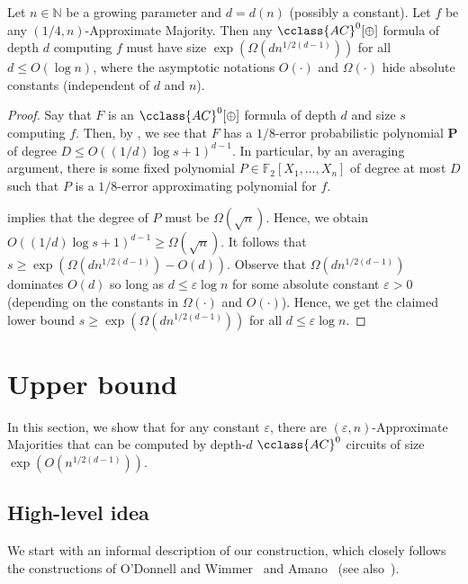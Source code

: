 \documentclass{toc}
\newcommand{\eps}{\varepsilon}
\newcommand{\mb}{\mathbf}
\newcommand{\F}{\mathbb{F}}
\newcommand{\AC}{\cclass{AC}}
\begin{document}
\begin{corollary}
\label{cor:formula-lbd}
Let $n\in \mathbb{N}$ be a growing parameter and $d = d(n)$ (possibly a constant). 
Let $f$ be any $(1/4,n)$-Approximate Majority. Then any $\AC^0[\oplus]$ formula of depth $d$ computing $f$ must have size $\exp(\Omega(dn^{1/2(d-1)}))$ for all $d \le O(\log n)$, where the asymptotic notations $O(\cdot)$ and $\Omega(\cdot)$ hide absolute constants (independent of $d$ and $n$). 
\end{corollary}

\begin{proof}
Say that $F$ is an $\AC^0[\oplus]$ formula of depth $d$ and size $s$ computing $f$. Then, by , we see that $F$ has a $1/8$-error probabilistic polynomial $\mb P$ of degree $D\leq O(({1}/{d})\log s+1)^{d-1}$. In particular, by an averaging argument, there is some fixed polynomial $P\in \F_2[X_1,\ldots,X_n]$ of degree at most $D$ such that $P$ is a $1/8$-error approximating polynomial for $f$. 

 implies that the degree of $P$ must be $\Omega(\sqrt{n})$. Hence, we obtain $O(({1}/{d})\log s+1)^{d-1} \ge \Omega(\sqrt{n})$. It follows that
$s \ge \exp(\Omega(dn^{1/2(d-1)}) - O(d))$.
Observe that $\Omega(dn^{1/2(d-1)})$ dominates $O(d)$ so long as $d \le \eps \log n$ for some absolute constant $\eps > 0$ (depending on the constants in $\Omega(\cdot)$ and $O(\cdot)$). Hence, we get the claimed lower bound  $s \ge \exp(\Omega(dn^{1/2(d-1)}))$
for all $d \le \eps\log n$.
\end{proof}


%
\section{Upper bound}      %

In this section, we show that for any constant $\varepsilon$, there are $(\varepsilon,n)$-Approximate Majorities that can be computed by depth-$d$ $\AC^0$ circuits of size $\exp(O(n^{1/2(d-1)}))$.

\subsection{High-level idea}

We start with an informal description of our construction, which closely follows the constructions of O'Donnell and Wimmer~\cite{odonnellwimmer} and Amano~\cite{Amano-appxmaj} (see also~\cite{Valiant-maj,hoory2006monotone}).
\end{document}
